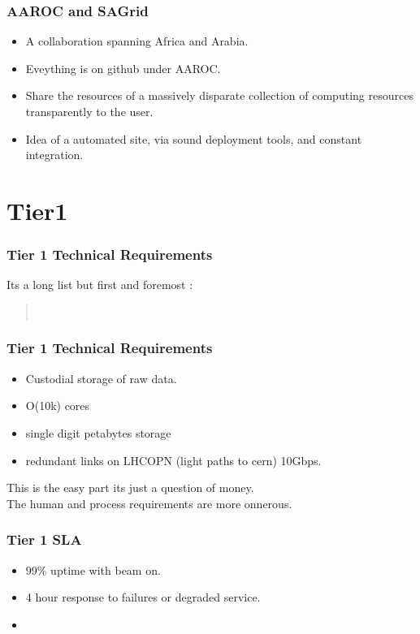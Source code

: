 \documentclass{beamer}
\begin{document}
\begin{frame}
\frametitle{AAROC and SAGrid}
\begin{itemize}
  \item A collaboration spanning Africa and Arabia.\\
  \item Eveything is on github under AAROC.\\
  \item Share the resources of a massively disparate collection of computing resources transparently to the user.\\
  \item Idea of a automated site, via sound deployment tools, and constant integration.
\end{itemize}
\end{frame}

\section{Tier1}

\begin{frame}
\frametitle{Tier 1 Technical Requirements} 
Its a long list but first and foremost :\\
\begin{quote}
  \\
\end{quote}
\end{frame}

\begin{frame}
\frametitle{Tier 1 Technical Requirements} 
\begin{itemize}
  \item Custodial storage of raw data.
  \item O(10k) cores
  \item single digit petabytes storage
  \item redundant links on LHCOPN (light paths to cern) 10Gbps.
\end{itemize}
This is the easy part its just a question of money.\\
The human and process requirements are more onnerous.
\end{frame}

\begin{frame}
  \frametitle{Tier 1 SLA}
  \begin{itemize}
    \item 99\% uptime with beam on.
    \item 4 hour response to failures or degraded service.
    \item  
  \end{itemize}
\end{frame}
\end{document}
